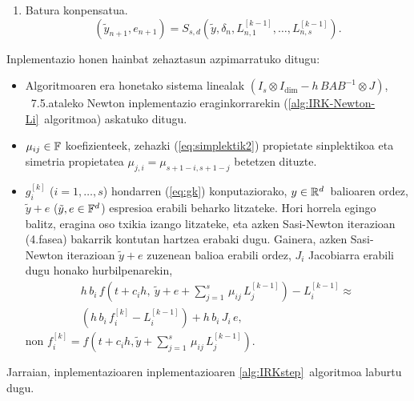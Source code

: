 \begin{enumerate}
\begin{enumerate}
\item Batura konpensatua.
\begin{equation*}
(\tilde y_{n+1},e_{n+1}) = S_{s,d}(\tilde y, \delta_n, L_{n,1}^{[k-1]}, \ldots, L_{n,s}^{[k-1]}).
\end{equation*}

\end{enumerate}

\end{enumerate}

 
Inplementazio honen hainbat zehaztasun azpimarratuko ditugu:
\begin{itemize}

\item Algoritmoaren era honetako sistema linealak $(I_s \otimes I_\dim  - h \, B A B^{-1} \otimes J )$, ~7.5.ataleko Newton inplementazio eraginkorrarekin  (\ref{alg:IRK-Newton-Li}~algoritmoa) askatuko ditugu.

\item $\mu_{i j} \in \mathbb{F}$ koefizienteek, zehazki (\ref{eq:simplektik2}) propietate sinplektikoa  eta simetria propietatea $\mu_{j, i} = \mu_{s+1-i,s+1-j}$  betetzen dituzte.

\item $g_i^{[k]}$  ($i=1,\dots,s$) hondarren (\ref{eq:gk}) konputaziorako, $y\in \mathbb{R}^d$~balioaren ordez, $\tilde y + e$ ($\tilde y, e \in \mathbb{F}^d$) espresioa erabili beharko litzateke. Hori horrela egingo balitz, eragina oso txikia izango litzateke, eta azken Sasi-Newton iterazioan (4.fasea) bakarrik kontutan hartzea erabaki dugu. Gainera, azken Sasi-Newton iterazioan $\tilde y + e$ zuzenean balioa erabili ordez, $J_i$ Jacobiarra erabili dugu honako hurbilpenarekin,
\begin{gather*}
 h \, b_i\, f\left(t+c_i h, \ \tilde y + e +\sum_{j=1}^{s}\, \mu_{ij}\, L_{j}^{[k-1]}\right)  -L_{i}^{[k-1]} \approx \\
\left(h \, b_i\, f_i^{[k]} -L_{i}^{[k-1]} \right) + h\, b_i \, J_i \, e,
\end{gather*}
%
non $f_i^{[k]}=f\left(t+c_i h,  \tilde y +\sum_{j=1}^{s}\, \mu_{ij}\, L_{j}^{[k-1]}\right)$.

\end{itemize}

Jarraian, inplementazioaren inplementazioaren \ref{alg:IRKstep}~algoritmoa laburtu dugu.

